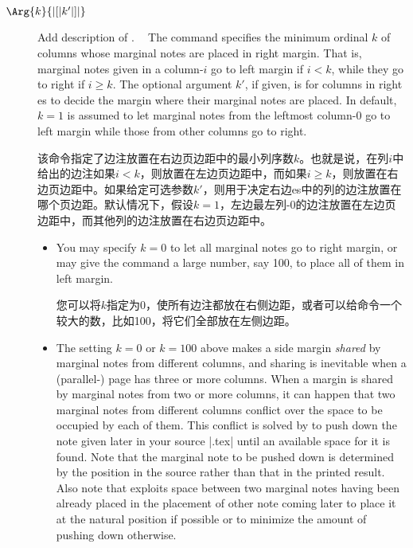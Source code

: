 \begin{description}
\item[\Midx{\!\marginparthreshold!}$\Arg{k}{|[|k'|]|}$]\mbox{}\par
{}
{Add description of .}

The command specifies the minimum ordinal $k$ of columns whose marginal
notes are placed in right margin.  That is, marginal notes given in a
column-$i$ go to left margin if $i<k$, while they go to right if $i\geq
k$.  The optional argument $k'$, if given, is for columns in right
\parapag{}es to decide the margin where their marginal notes are placed.
In default, $k=1$ is assumed to let marginal notes from the leftmost
column-0 go to left margin while those from other columns go to right.

该命令指定了边注放置在右边页边距中的最小列序数$k$。也就是说，在列$i$中给出的边注如果$i<k$，则放置在左边页边距中，而如果$i\geq k$，则放置在右边页边距中。如果给定可选参数$k'$，则用于决定右边\parapag{}es中的列的边注放置在哪个页边距。默认情况下，假设$k=1$，左边最左列-0的边注放置在左边页边距中，而其他列的边注放置在右边页边距中。
\begin{itemize}
\item
You may specify $k=0$ to let all marginal notes go to right margin, or may
give the command a large number, say 100, to place all of them in left
margin.

您可以将$k$指定为0，使所有边注都放在右侧边距，或者可以给命令一个较大的数，比如100，将它们全部放在左侧边距。

\item
The setting $k=0$ or $k=100$ above makes a side margin \emph{shared} by
marginal notes from different columns, and sharing is inevitable when a
(parallel-) page has three or more columns.  When a margin is shared by
marginal notes from two or more columns, it can happen that two marginal
notes from different columns conflict over the space to be occupied by each
of them.  This conflict is solved by \Paracol{} to push down the note
given later in your source |.tex| until an available space for it is
found.  Note that the marginal note to be pushed down is determined by the
position in the source rather than that in the printed result.  Also note
that \Paracol{} exploits space between two marginal notes having been
already placed in the placement of other note coming later to place it at
the natural position if possible or to minimize the amount of pushing down
otherwise.


\end{itemize}
\end{description}
